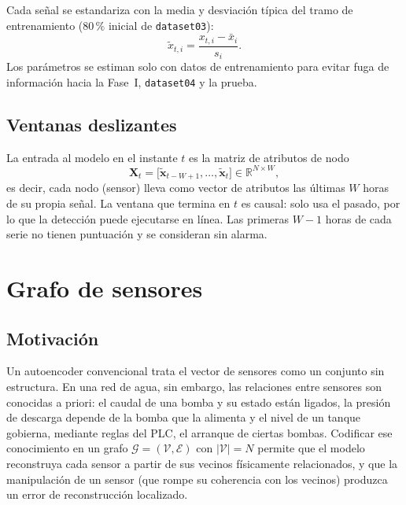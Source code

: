 \documentclass[11pt,a4paper]{article}
\newcommand{\R}{\mathbb{R}}
\newcommand{\X}{\mathbf{X}}
\begin{document}
Cada señal se estandariza con la media y desviación típica del tramo de
entrenamiento ($80\,\%$ inicial de \texttt{dataset03}):
\begin{equation}
\tilde x_{t,i} = \frac{x_{t,i}-\bar x_i}{s_i}.
\end{equation}
Los parámetros se estiman solo con datos de entrenamiento para evitar fuga de
información hacia la Fase~I, \texttt{dataset04} y la prueba.

\subsection{Ventanas deslizantes}

La entrada al modelo en el instante $t$ es la matriz de atributos de nodo
\begin{equation}
\X_t = \big[\tilde{\mathbf{x}}_{t-W+1},\dots,\tilde{\mathbf{x}}_{t}\big]
\in\R^{N\times W},
\end{equation}
es decir, cada nodo (sensor) lleva como vector de atributos las últimas $W$ horas de
su propia señal. La ventana que termina en $t$ es causal: solo usa el pasado, por lo
que la detección puede ejecutarse en línea. Las primeras $W-1$ horas de cada serie no
tienen puntuación y se consideran sin alarma.

\section{Grafo de sensores}

\subsection{Motivación}

Un autoencoder convencional trata el vector de sensores como un conjunto sin
estructura. En una red de agua, sin embargo, las relaciones entre sensores son
conocidas a priori: el caudal de una bomba y su estado están ligados, la presión de
descarga depende de la bomba que la alimenta y el nivel de un tanque gobierna,
mediante reglas del PLC, el arranque de ciertas bombas. Codificar ese conocimiento en
un grafo $\mathcal{G}=(\mathcal{V},\mathcal{E})$ con $|\mathcal{V}|=N$ permite que el
modelo reconstruya cada sensor a partir de sus vecinos físicamente relacionados, y que
la manipulación de un sensor (que rompe su coherencia con los vecinos) produzca un
error de reconstrucción localizado.
\end{document}
